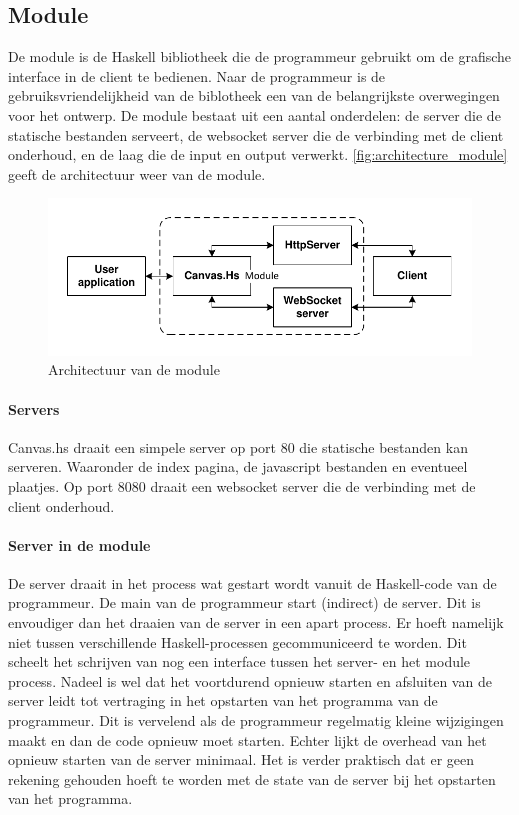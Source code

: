 \subsection{Module}
De module is de Haskell bibliotheek die de programmeur gebruikt om de grafische interface in de client te bedienen. Naar de programmeur is de gebruiksvriendelijkheid van de biblotheek een van de belangrijkste overwegingen voor het ontwerp. De module bestaat uit een aantal onderdelen: de server die de statische bestanden serveert, de websocket server die de verbinding met de client onderhoud, en de laag die de input en output verwerkt. \autoref{fig:architecture_module} geeft de architectuur weer van de module.

\begin{figure}
\begin{center}
\includegraphics[keepaspectratio,width=\textwidth]{./images/module_architecture.pdf}
\caption{Architectuur van de module}
\label{fig:architecture_module}
\end{center}
\end{figure}

\paragraph{Servers}
Canvas.hs draait een simpele server op port 80 die statische bestanden kan serveren. Waaronder de index pagina, de javascript bestanden en eventueel plaatjes. Op port 8080 draait een websocket server die de verbinding met de client onderhoud.


\paragraph{Server in de module}
De server draait in het process wat gestart wordt vanuit de Haskell-code van de programmeur. De main van de programmeur start (indirect) de server. Dit is envoudiger dan het draaien van de server in een apart process. Er hoeft namelijk niet tussen verschillende Haskell-processen gecommuniceerd te worden. Dit scheelt het schrijven van nog een interface tussen het server- en het module process. Nadeel is wel dat het voortdurend opnieuw starten en afsluiten van de server leidt tot vertraging in het opstarten van het programma van de programmeur. Dit is vervelend als de programmeur regelmatig kleine wijzigingen maakt en dan de code opnieuw moet starten. Echter lijkt de overhead van het opnieuw starten van de server minimaal. Het is verder praktisch dat er geen rekening gehouden hoeft te worden met de state van de server bij het opstarten van het programma.

